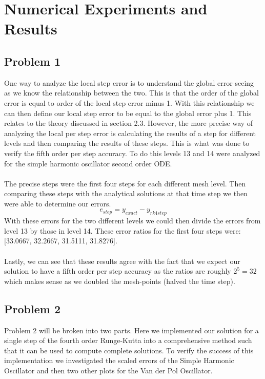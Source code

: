 \documentclass{article}
\begin{document}
\section{Numerical Experiments and Results}
\subsection{Problem 1}
One way to analyze the local step error is to understand the global error seeing as we know the relationship between the two. This is that the order of the global error is equal to order of the local step error minus 1. With this relationship we can then define our local step error to be equal to the global error plus 1. This relates to the theory discussed in section 2.3. However, the more precise way of analyzing the local per step error is calculating the results of a step for different levels and then comparing the results of these steps. This is what was done to verify the fifth order per step accuracy. To do this levels 13 and 14 were analyzed for the simple harmonic oscillator second order ODE.\\
\\
The precise steps were the first four steps for each different mesh level. Then comparing these steps with the analytical solutions at that time step we then were able to determine our errors. $$e_{step} = y_{exact} - y_{rk4step}$$
With these errors for the two different levels we could then divide the errors from level 13 by those in level 14. These error ratios for the first four steps were: [33.0667,   32.2667,   31.5111,   31.8276].\\
\\ Lastly, we can see that these results agree with the fact that we expect our solution to have a fifth order per step accuracy as the ratios are roughly $2^5 = 32$ which makes sense as we doubled the mesh-points (halved the time step).

\subsection{Problem 2}
Problem 2 will be broken into two parts. Here we implemented our solution for a single step of the fourth order Runge-Kutta into a comprehensive method such that it can be used to compute complete solutions. To verify the success of this implementation we investigated the scaled errors of the Simple Harmonic Oscillator and then two other plots for the Van der Pol Oscillator.
\end{document}
